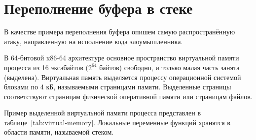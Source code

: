 \section{Переполнение буфера в стеке}

В качестве примера переполнения буфера опишем самую распространённую атаку, направленную на исполнение кода злоумышленника.

В 64-битовой x86-64 архитектуре основное пространство виртуальной памяти процесса из 16 эксабайтов ($2^{64}$ байтов) свободно, и только малая часть занята (выделена). Виртуальная память выделяется процессу операционной системой блоками по 4 кБ, называемыми страницами памяти. Выделенные страницы соответствуют страницам физической оперативной памяти или страницам файлов.

Пример выделенной виртуальной памяти процесса представлен в таблице~\ref{tab:virtual-memory}. Локальные переменные функций хранятся в области памяти, называемой стеком.
\begin{table}[!ht]
    \centering
    \caption{Пример структуры виртуальной памяти процесса\label{tab:virtual-memory}}
\end{table}

